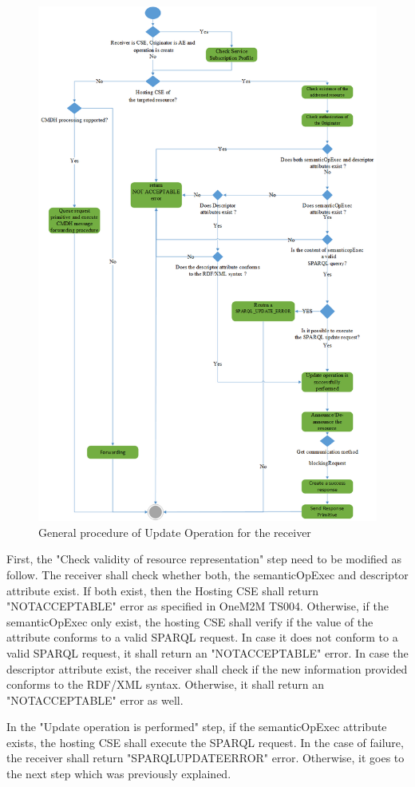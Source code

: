 \begin{figure}[htbp]
    \centering
    \includegraphics[width=1.1\textwidth]{resources/images/update2}
    \caption{General procedure of Update Operation for the receiver }\label{fig:contrib1:update}
\end{figure}
 First, the "Check validity of resource representation" step need to be modified as follow. The receiver shall check whether both, the semanticOpExec and descriptor attribute exist. If both exist, then the Hosting CSE shall return "NOT\textunderscore ACCEPTABLE" error as specified in OneM2M TS004. Otherwise, if the semanticOpExec only exist, the hosting CSE shall verify if the value of the attribute conforms to a valid SPARQL request. In case it does not conform to a valid SPARQL request, it shall return an "NOT\textunderscore ACCEPTABLE" error. In case the descriptor attribute exist, the receiver shall check if the new information provided conforms to the RDF/XML syntax. Otherwise, it shall return an "NOT\textunderscore ACCEPTABLE" error as well. \item
In the "Update operation is performed" step, if the semanticOpExec attribute exists, the hosting CSE shall execute the SPARQL request. In the case of failure, the receiver shall return "SPARQL\textunderscore UPDATE\textunderscore ERROR" error. Otherwise, it goes to the next step which was previously explained.
